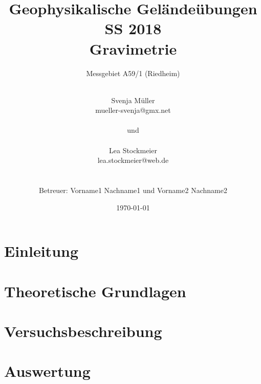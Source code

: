 \documentclass{include/protokollclass}
\title{Geophysikalische Geländeübungen \\ SS 2018 \\ Gravimetrie}
\subtitle{Messgebiet A59/1 (Riedheim)}
\author{\\ Svenja Müller \\ mueller-svenja@gmx.net
\\ \\und\\ \\
Lea Stockmeier \\ lea.stockmeier@web.de \\ \\ \\
Betreuer: Vorname1 Nachname1 und Vorname2 Nachname2}
\date{\vfill\vfill\vfill \today}
\begin{document}
    \FrontMatter
    \maketitle


    \begingroup \let\clearpage\relax    %
    \tableofcontents                    %
    \listoffigures
    \endgroup



    \MainMatter
    
    

    \chapter{Einleitung}
    

    \chapter{Theoretische Grundlagen}
    
    
    \chapter{Versuchsbeschreibung}
    
    
    \chapter{Auswertung}
    




    \TheBibliography

    
    

\end{document}
